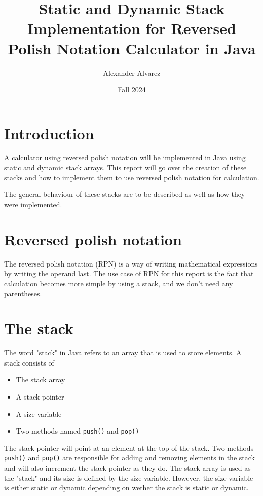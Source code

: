\documentclass[a4paper,11pt]{article}
\begin{document}
\title{
  \textbf{Static and Dynamic Stack Implementation for Reversed
  Polish Notation Calculator in Java}
}
\author{Alexander Alvarez}
\date{Fall 2024}

\maketitle

\section*{Introduction}

A calculator using reversed polish notation will be implemented
in Java using static and dynamic stack arrays. This report will
go over the creation of these stacks and how to implement them
to use reversed polish notation for calculation.

The general behaviour of these stacks are to be described as well
as how they were implemented.

\section*{Reversed polish notation}

The reversed polish notation (RPN) is a way of writing mathematical
expressions by writing the operand last. The use case of RPN for
this report is the fact that calculation becomes more simple 
by using a stack, and we don't need any parentheses. 

\section*{The stack}

The word "stack" in Java refers to an array that is used to store
elements. A stack consists of 

\begin{itemize}
  \item The stack array
  
  \item A stack pointer
  
  \item A size variable
  
  \item Two methods named {\tt push()} and {\tt pop()}
\end{itemize}

The stack pointer will point at an element at the top of the stack. 
Two methods {\tt push()} and {\tt pop()} are responsible for adding 
and removing elements in the stack and will also increment the stack 
pointer as they do. The stack array is used as the "stack" and its 
size is defined by the size variable. However, the size variable is 
either static or dynamic depending on wether the stack is static or 
dynamic.
\end{document}
